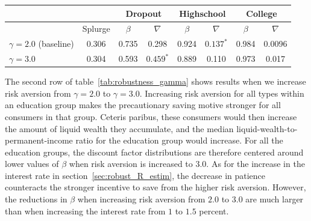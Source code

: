 \documentclass[\latexroot/\projectname]{subfiles}
\begin{document}
\begin{center}
  \begin{tabular}{lc|cccccc}
    \toprule
                              &         & \multicolumn{2}{c}{Dropout} & \multicolumn{2}{c}{Highschool} & \multicolumn{2}{c}{College}                                                              \\ \midrule
                              & Splurge & $\beta$                     & $\nabla$                       & $\beta$                     & $\nabla$    & $\beta$                           & $\nabla$ \\ \midrule
    $\gamma = 2.0$ (baseline) & 0.306   & 0.735                       & 0.298                          & 0.924                       & $0.137^{*}$ & 0.984                             & 0.0096   \\
    $\gamma = 3.0$            & 0.304   & 0.593                       & $0.459^{*}$                    & 0.889                       & 0.110       & 0.973                             & 0.017
    \\ \bottomrule
  \end{tabular}
\end{center}
\label{tab:robustness_gamma}

The second row of table~\ref{tab:robustness_gamma} shows results when we increase risk aversion from $\gamma=2.0$ to $\gamma=3.0$.
Increasing risk aversion for all types within an education group makes the precautionary saving motive stronger for all consumers in that group.
Ceteris paribus, these consumers would then increase the amount of liquid wealth they accumulate, and the median liquid-wealth-to-permanent-income ratio for the education group would increase.
For all the education groups, the discount factor distributions are therefore centered around lower values of $\beta$ when risk aversion is increased to $3.0$.
As for the increase in the interest rate in section~\ref{sec:robust_R_estim}, the decrease in patience counteracts the stronger incentive to save from the higher risk aversion.
However, the reductions in $\beta$ when increasing risk aversion from $2.0$ to $3.0$ are much larger than when increasing the interest rate from $1$ to $1.5$ percent.
\end{document}
